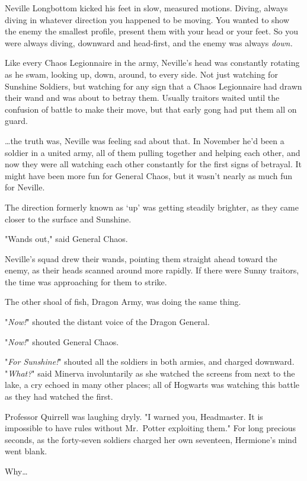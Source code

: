 Neville Longbottom kicked his feet in slow, measured motions. Diving, always
diving in whatever direction you happened to be moving. You wanted to show the
enemy the smallest profile, present them with your head or your feet. So you
were always diving, downward and head-first, and the enemy was always
\emph{down.}

Like every Chaos Legionnaire in the army, Neville's head was constantly
rotating as he swam, looking up, down, around, to every side. Not just watching
for Sunshine Soldiers, but watching for any sign that a Chaos Legionnaire had
drawn their wand and was about to betray them. Usually traitors waited until
the confusion of battle to make their move, but that early gong had put them
all on guard.

{\ldots}the truth was, Neville was feeling sad about that. In November he'd
been a soldier in a united army, all of them pulling together and helping each
other, and now they were all watching each other constantly for the first signs
of betrayal. It might have been more fun for General Chaos, but it wasn't
nearly as much fun for Neville.

The direction formerly known as `up' was getting steadily brighter, as they
came closer to the surface and Sunshine.

"Wands out," said General Chaos.

Neville's squad drew their wands, pointing them straight ahead toward the
enemy, as their heads scanned around more rapidly. If there were Sunny
traitors, the time was approaching for them to strike.

The other shoal of fish, Dragon Army, was doing the same thing.

"\emph{Now!}" shouted the distant voice of the Dragon General.

"\emph{Now!}" shouted General Chaos.

"\emph{For Sunshine!}" shouted all the soldiers in both armies, and charged
downward.
\later
"\emph{What?}" said Minerva involuntarily as she watched the screens from next
to the lake, a cry echoed in many other places; all of Hogwarts was watching
this battle as they had watched the first.

Professor Quirrell was laughing dryly. "I warned you, Headmaster. It is
impossible to have rules without Mr.~Potter exploiting them."
\later
For long precious seconds, as the forty-seven soldiers charged her own
seventeen, Hermione's mind went blank.

Why{\ldots}

